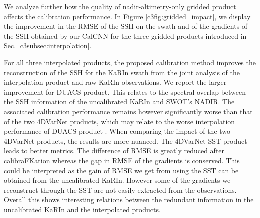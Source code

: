 \begin{bibunit}
We analyze further how the quality of nadir-altimetry-only gridded product affects the calibration performance.
In Figure \ref{c3fig:gridded_impact}, we display the improvement in the RMSE of the SSH on the swath and of the gradients of the SSH obtained by our CalCNN for the three gridded products introduced in Sec. \ref{c3subsec:interpolation}.

For all three interpolated products, the proposed calibration method improves the reconstruction of the SSH for the KaRIn swath from the joint analysis of the interpolation product and raw KaRIn observations. We report the larger improvement for DUACS product. This relates to the spectral overlap between the SSH information of the uncalibrated KaRIn and SWOT's NADIR. The associated calibration performance remains however significantly worse than that of the two 4DVarNet products, which may relate to the worse interpolation performance of DUACS product \cite{fablet_end2end_2021,osse_data_challenge}. 
When comparing the impact of the two 4DVarNet products, the results are more nuanced. The 4DVarNet-SST product leads to better metrics. The difference of RMSE is greatly reduced after calibraFKation whereas the gap in RMSE of the gradients is conserved.
This could be interpreted as the gain of RMSE we get from using the SST can be obtained from the uncalibrated KaRIn. However some of the gradients we reconstruct through the SST are not easily extracted from the observations.
Overall this shows interesting relations between the redundant information in the uncalibrated KaRIn and the interpolated products.


\end{bibunit}
